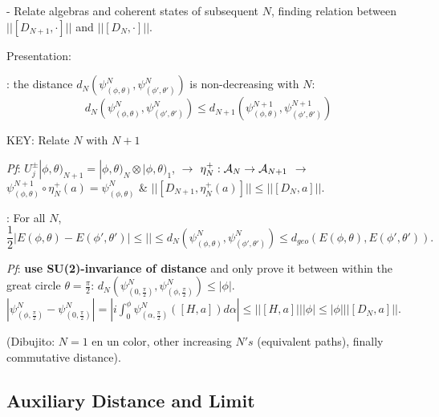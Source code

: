 {\color{gray} 
 - Relate algebras and coherent states of subsequent $N$, finding relation between $||[D_{N+1}, \cdot]||$ and $||[D_N, \cdot]||$.
 
Presentation:

: the distance $d_N(\psi^N_{(\phi, \theta)}, \psi^N_{(\phi', \theta')})$ is non-decreasing with $N$:
\begin{equation}
    d_N(\psi^N_{(\phi, \theta)}, \psi^N_{(\phi', \theta')}) \leq d_{N+1}(\psi^{N+1}_{(\phi, \theta)}, \psi^{N+1}_{(\phi', \theta')})
\end{equation}

 KEY: Relate $N$ with $N+1$
 
\textit{Pf}: $U^\pm_j |\phi, \theta)_{N+1} = |\phi, \theta)_N \otimes |\phi, \theta)_1$, $\xrightarrow{}$ $\eta^+_N: \mathcal A_N \to \mathcal A_{N + 1}$ $\longrightarrow{}$ $\psi^{N+1}_{(\phi, \theta)} \circ \eta^+_N(a) = \psi^N_{(\phi, \theta)}$ \& $||[D_{N + 1}, \eta^+_N(a)]|| \leq ||[D_N, a]||$.

: For all $N$, 
\begin{equation}
    \frac{1}{2}|E(\phi, \theta)- E(\phi', \theta')| \leq || \leq d_N(\psi^N_{(\phi, \theta)}, \psi^N_{(\phi', \theta')}) \leq d_{geo}(E(\phi, \theta), E(\phi', \theta')).
\end{equation}

\textit{Pf}: \textbf{use SU(2)-invariance of distance} and only prove it between within the great circle $\theta = \frac{\pi}{2}$: $d_N(\psi^N_{(0, \frac{\pi}{2})}, \psi^N_{(\phi, \frac{\pi}{2})}) \leq |\phi|$. 
$|\psi^N_{(\phi, \frac{\pi}{2})} - \psi^N_{(0, \frac{\pi}{2})}| = |i \int_0^\phi \psi^N_{(\alpha, \frac{\pi}{2})}([H, a]) d\alpha | \leq ||[H, a]|| |\phi| \leq |\phi| ||[D_N, a]||$.

(Dibujito: $N=1$ en un color, other increasing $N's$ (equivalent paths), finally commutative distance).
}

\linea

\subsection{Auxiliary Distance and Limit}

